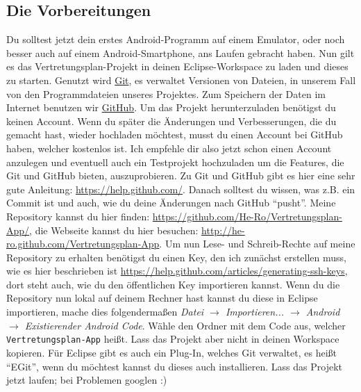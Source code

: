 \documentclass[12pt,headsepline]{scrartcl}
\begin{document}
\subsection{Die Vorbereitungen}
Du solltest jetzt dein erstes Android-Programm auf einem Emulator, oder noch besser auch auf einem Android-Smartphone, ans Laufen gebracht haben. Nun gilt es das Vertretungsplan-Projekt in deinen Eclipse-Workspace zu laden und dieses zu starten.
Genutzt wird \href{http://git-scm.com/}{Git}, es verwaltet Versionen von Dateien, in unserem Fall von den Programmdateien unseres Projektes. Zum Speichern der Daten im Internet benutzen wir \href{http://www.github.com}{GitHub}. Um das Projekt herunterzuladen benötigst du keinen Account. Wenn du später die Änderungen und Verbesserungen, die du gemacht hast, wieder hochladen möchtest, musst du einen Account bei GitHub haben, welcher kostenlos ist. Ich empfehle dir also jetzt schon einen Account anzulegen und eventuell auch ein Testprojekt hochzuladen um die Features, die Git und GitHub bieten, auszuprobieren. Zu Git und GitHub gibt es hier eine sehr gute Anleitung: \url{https://help.github.com/}. Danach solltest du wissen, was z.B. ein Commit ist und auch, wie du deine Änderungen nach GitHub ``pusht''.
Meine Repository kannst du hier finden: \url{https://github.com/He-Ro/Vertretungsplan-App/}, die Webseite kannst du hier besuchen: \url{http://he-ro.github.com/Vertretungsplan-App}.
Um nun Lese- und Schreib-Rechte auf meine Repository zu erhalten benötigst du einen Key, den ich zunächst erstellen muss, wie es hier beschrieben ist \url{https://help.github.com/articles/generating-ssh-keys}, dort steht auch, wie du den öffentlichen Key importieren kannst.
Wenn du die Repository nun lokal auf deinem Rechner hast kannst du diese in Eclipse importieren, mache dies folgendermaßen \textit{Datei $\rightarrow$ Importieren... $\rightarrow$ Android $\rightarrow$ Existierender Android Code}. Wähle den Ordner mit dem Code aus, welcher \texttt{Vertretungsplan-App} heißt. Lass das Projekt aber nicht in deinen Workspace kopieren. Für Eclipse gibt es auch ein Plug-In, welches Git verwaltet, es heißt ``EGit'', wenn du möchtest kannst du dieses auch installieren.
Lass das Projekt jetzt laufen; bei Problemen googlen :)
\newpage
\end{document}
